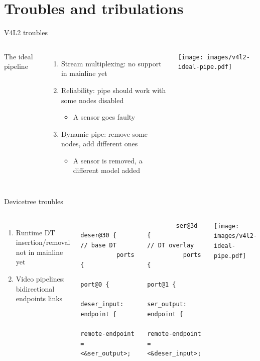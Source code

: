 \documentclass[xetex,table,aspectratio=169]{beamer}
\begin{document}
\section{Troubles and tribulations}

\begin{frame}{V4L2 troubles}
  \begin{columns}
    \begin{flushright}
      The ideal pipeline \textrightarrow
    \end{flushright}

    \vspace{0.2\textheight}

    \begin{enumerate}
    \item Stream multiplexing: no support in mainline yet
    \item Reliability: pipe should work with some nodes disabled
      \begin{itemize}
      \item A sensor goes faulty
      \end{itemize}
    \item Dynamic pipe: remove some nodes, add different ones
      \begin{itemize}
      \item A sensor is removed, a different model added
      \end{itemize}
    \end{enumerate}

    \center\texttt{[image: images/v4l2-ideal-pipe.pdf]}
  \end{columns}
\end{frame}

\begin{frame}[fragile]{Devicetree troubles}
  \begin{columns}
    \begin{enumerate}
    \item Runtime DT insertion/removal not in mainline yet
    \item Video pipelines: bidirectional endpoints links
    \end{enumerate}

    \begin{verbatim}
        deser@30 {                               // base DT
          ports {
            port@0 {
              deser_input: endpoint {
                remote-endpoint = <&ser_output>;
    \end{verbatim}

    \begin{verbatim}
        ser@3d {                              // DT overlay
          ports {
            port@1 {
              ser_output: endpoint {
                remote-endpoint = <&deser_input>;
    \end{verbatim}

    \center\texttt{[image: images/v4l2-ideal-pipe.pdf]}
  \end{columns}
\end{frame}
\end{document}
